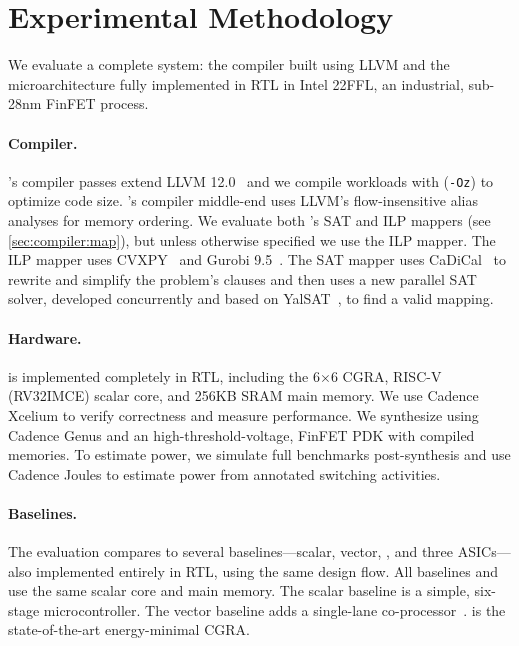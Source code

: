 \section{Experimental Methodology}
\label{sec:method}

We evaluate a complete \riptide system: the compiler built using LLVM and the
microarchitecture fully implemented in RTL in Intel 22FFL,
an industrial, sub-28nm FinFET process.

\paragraph{Compiler.}
\riptide's compiler passes extend LLVM 12.0~\cite{llvm} and we compile workloads with
(\texttt{-Oz}) to optimize code size.  
% 
\riptide's compiler middle-end uses LLVM's
flow-insensitive alias analyses for memory ordering.
%
We evaluate both \riptide's SAT and ILP mappers (see \autoref{sec:compiler:map}), but unless otherwise specified we use the ILP mapper.
% 
The ILP mapper uses CVXPY~\cite{cvxpy} and Gurobi 9.5~\cite{gurobi}.
%
The SAT mapper uses CaDiCal~\cite{cadical} to rewrite and simplify the problem's clauses and then uses a new parallel SAT solver, developed concurrently and based on YalSAT~\cite{yalsat}, to find a valid mapping.

\paragraph{Hardware.}
\label{method:hardware}
\riptide is implemented completely in RTL, including the 6$\times$6 CGRA, RISC-V
(RV32IMCE) scalar core, and 256KB
SRAM main memory. 
% 
We use Cadence Xcelium to verify correctness and measure
performance.
% 
We synthesize \riptide using Cadence Genus and an
high-threshold-voltage, FinFET PDK with compiled memories.
% 
To estimate power, we simulate full benchmarks post-synthesis and use Cadence
Joules to estimate power from annotated switching activities.

\paragraph{Baselines.}
The evaluation compares to several baselines---scalar, vector, \snafu, and
three ASICs---also implemented entirely in RTL, using the same design
flow.
% 
All baselines and \riptide use the same scalar core and main memory.
% 
The scalar baseline is a simple, six-stage microcontroller.
% 
The vector baseline adds a single-lane co-processor~\cite{manic}.
% 
\snafu is the state-of-the-art energy-minimal CGRA.

